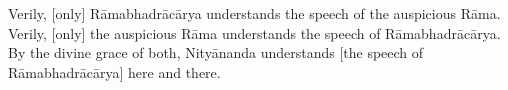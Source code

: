 \vspace{-2mm}
\begin{sloppypar}\justifying\noindent\hspace{10mm} {\engtextfont \lqtwo Verily, [only] Rāmabhadrācārya understands the speech of the auspicious Rāma. Verily, [only] the auspicious Rāma understands the speech of Rāmabhadrācārya. By the divine grace of both, Nityānanda understands [the speech of Rāmabhadrācārya] here and there.\rqtwo}\end{sloppypar}
\vspace{5mm}
\\
\\
\vspace{5mm}
